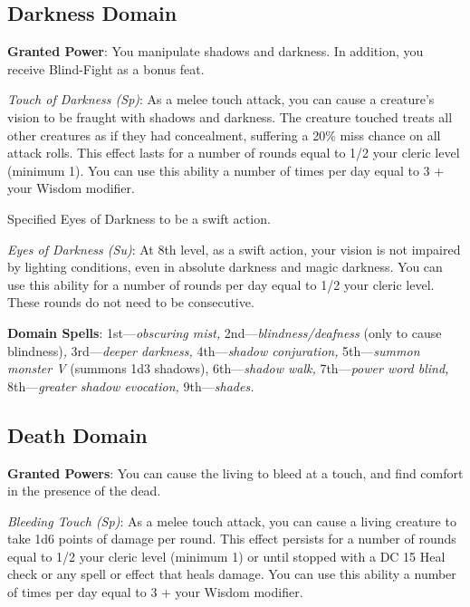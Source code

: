 \subsection{Darkness Domain}


\textbf{Granted Power}: You manipulate shadows and darkness. In addition, you receive Blind-Fight as a bonus feat.

\textit{Touch of Darkness (Sp)}: As a melee touch attack, you can cause a creature's vision to be fraught with
    shadows and darkness. The creature touched treats all other creatures as if they had concealment, suffering
    a 20\% miss chance on all attack rolls. This effect lasts for a number of rounds equal to 1/2 your cleric
    level (minimum 1). You can use this ability a number of times per day equal to 3 + your Wisdom modifier.
\begin{formal}
 Specified Eyes of Darkness to be a swift action.
\end{formal}

\textit{Eyes of Darkness (Su)}: At 8th level, as a swift action, your vision is not impaired by lighting conditions,
    even in absolute darkness and magic darkness. You can use this ability for a number of rounds per day equal to
    1/2 your cleric level. These rounds do not need to be consecutive.

\textbf{Domain Spells}: 1st---\textit{obscuring mist, }2nd---\textit{blindness/deafness} (only to cause blindness)\textit{, }3rd---\textit{deeper darkness, }4th---\textit{shadow conjuration, }5th---\textit{summon monster V }(summons 1d3 shadows), 6th---\textit{shadow walk, }7th---\textit{power word blind, }8th---\textit{greater shadow evocation, }9th---\textit{shades. } 
				
\subsection{Death Domain}


\textbf{Granted Powers}: You can cause the living to bleed at a touch, and find comfort in the presence of the dead.

\textit{Bleeding Touch (Sp)}: As a melee touch attack, you can cause a living creature to take 1d6 points of damage 
    per round. This effect persists for a number of rounds equal to 1/2 your cleric level (minimum 1) or until
    stopped with a DC 15 Heal check or any spell or effect that heals damage. You can use this ability a number
    of times per day equal to 3 + your Wisdom modifier.

